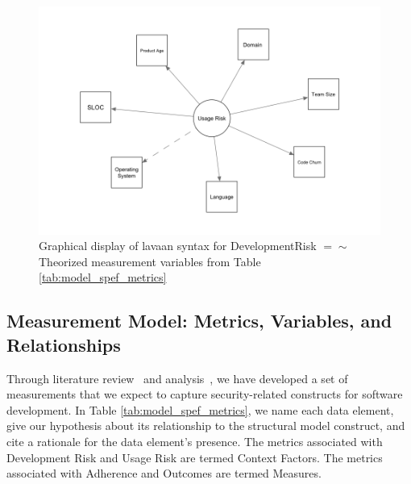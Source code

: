 \begin{figure}
	\centering
		\includegraphics[width=1\textwidth]{syntax_usagerisk_asmeasuredby.png}
		\caption{Graphical display of lavaan syntax for DevelopmentRisk $=\sim$ Theorized measurement variables from Table  \ref{tab:model_spef_metrics}}
		\label{fig:model_example_syntax_asmeasuredby}	
\end{figure}



\subsection{Measurement Model: Metrics, Variables, and Relationships}
\label{sec:model_measurement}
Through literature review~\cite{morrison2014mapping} and analysis~\cite{morrison2017surveying,morrison2017measuring}, we have developed a set of measurements that we expect to capture security-related constructs for software development. In Table \ref{tab:model_spef_metrics}, we name each data element, give our hypothesis about its relationship to the structural model construct, and cite a rationale for the data element's presence. The metrics associated with Development Risk and Usage Risk are termed Context Factors. The metrics associated with Adherence and Outcomes are termed Measures. 
		
